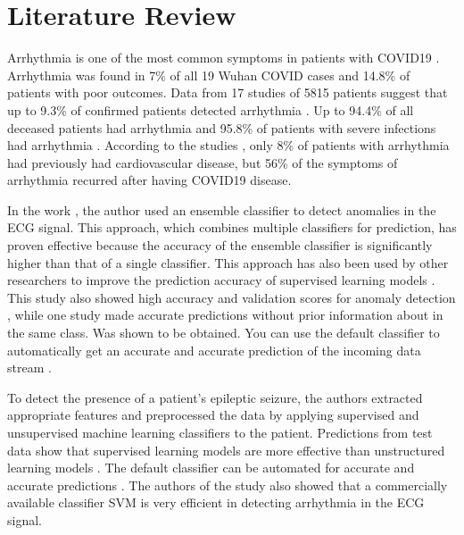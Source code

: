 \section{Literature Review} \label{sec:literature_review}
Arrhythmia is one of the most common symptoms in patients with COVID19 \cite{babapoor2020arrhythmia}. Arrhythmia was found in 7\% of all 19 Wuhan COVID cases and 14.8\% of patients with poor outcomes. Data from 17 studies of 5815 patients suggest that up to 9.3\% of confirmed patients detected arrhythmia \cite{mulia2021atrial, liu2020clinical}. Up to 94.4\% of all deceased patients had arrhythmia and 95.8\% of patients with severe infections had arrhythmia \cite{beri2020cardiac, ren2020clinical}. According to the studies \cite{babapoor2020arrhythmia, liu2020clinical, yarmohammadi2021frequency}, only 8\% of patients with arrhythmia had previously had cardiovascular disease, but 56\% of the symptoms of arrhythmia recurred after having COVID19 disease.

In the work \cite{sun2020multi}, the author used an ensemble classifier to detect anomalies in the ECG signal. This approach, which combines multiple classifiers for prediction, has proven effective because the accuracy of the ensemble classifier is significantly higher than that of a single classifier. This approach has also been used by other researchers to improve the prediction accuracy of supervised learning models \cite{huang2020accurate, rajak2020applying, liu2020parallel}. This study also showed high accuracy and validation scores for anomaly detection \cite{huang2020accurate, liu2020parallel}, while one study made accurate predictions without prior information about \cite{rajak2020applying} in the same class. Was shown to be obtained. You can use the default classifier to automatically get an accurate and accurate prediction of the incoming data stream \cite{imbrea2021automated}.

To detect the presence of a patient's epileptic seizure, the authors extracted appropriate features and preprocessed the data by applying supervised and unsupervised machine learning classifiers to the patient. Predictions from test data show that supervised learning models are more effective than unstructured learning models \cite{siddiqui2020review}. The default classifier can be automated for accurate and accurate predictions \cite{imbrea2021automated}. The authors of the \cite{jha2020cardiac} study also showed that a commercially available classifier SVM is very efficient in detecting arrhythmia in the ECG signal.

